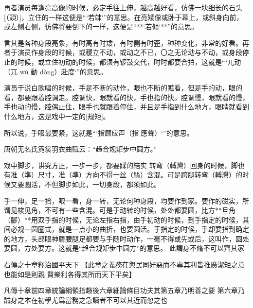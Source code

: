 \documentclass{zhvt-classic}
\begin{document}
再者演员每逢亮高像的时候，必定手往上伸，越高越好看，仿佛一块细长的石头[（頭）]，立住的一样这便是“`若竦`”的意思。在亮矮像或卧于幕上，或斜身向前，或左侧右侧，彷佛将要倒下的一样，这便是“**`若倾`**”的意思。

言其是各种身段亮象，有时高有时矮，有时侧有时歪，种种变化，非常的好看。再者于演员作身段的时候，或稷立不动，或动之不已，〇之无论动与不动，或身段停止的时候，或立住初动的时候，都须有锣鼓交代，时时都要合拍，这就是“`兀动（兀 wù 動 dòng）赴度`”的意思。

演员于说白歌唱的时候，手是不断的动作，眼也不断的瞧看，但是手的动，眼的看，都要跟着腔调走。腔调快，眼就看的快，手也指的快。腔调慢，眼就看的慢，手也动的慢，腔偶止住，眼手也就跟着停住，并且是手指到什么地方，眼睛就看到什么地方，这是戏中一定的[规矩]。

所以说，手眼最要紧，这就是“`指顾应声（指𮸹應聲）`”的意思。

\begin{preface}
  唐朝无名氏霓裳羽衣曲赋云：“趋合规矩步中圆方。”
\end{preface}

戏中脚步，讲究方正，一步一步，都要踩的結实 转弯（𨍭灣）回身的时候，脚也有准（準）尺寸，准（準）方向不得一丝（絲）含混。可是跨腿转弯（𨍭灣）的时候又要圆活，不但脚步如此，一切身段，都须如此。

手一伸，足一拾，眼一看，身一转，无论何种身段，均要作到家。要作的磁实，所谓见梭见角，不可有一些含混。可是于动转的时候，处处都要圆，比方**旦角（腳）**用双手指的时候，无论左指右指，由手初动的时候，到手指定的时候，其间必规一圆圈式，就是一点小的曲折，也要圆活。于指定的时候，手却要指到确定的地方，头部眼神屑腰腿足都要与手随时动作，一毫不得或先或后，这叫作，圆处要圆，方处要方。这就是“趋合规矩步中圆方”的意思。
此謂身不脩不可以齊其家

\begin{preface}
右傳之十章釋治國平天下
  【此章之義務在與民同好惡而不專其利皆推廣潔矩之意也能如是則親
    賢樂利各得其所而天下平矣】

凡傳十章前四章統論綱領指趣後六章細論條目功夫其第五章乃明善之要
第六章乃誠身之本在初學尤爲當務之急讀者不可以其近而忽之也
\end{preface}
\end{document}
